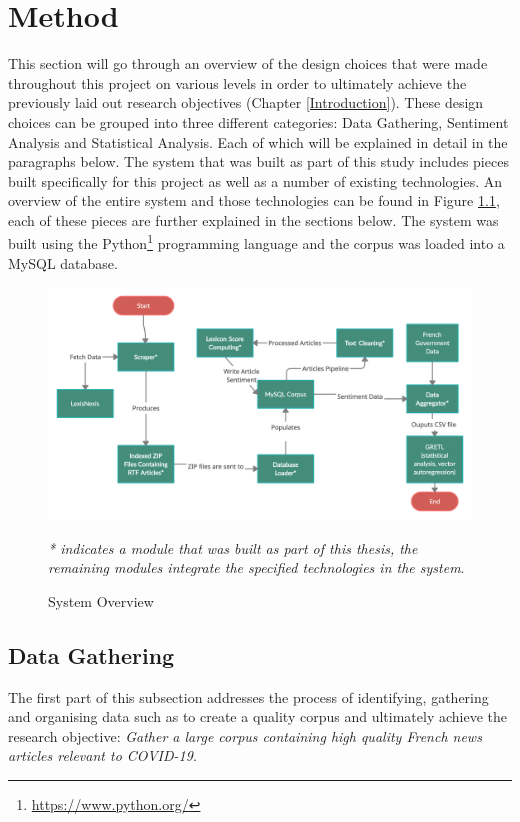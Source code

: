 \chapter{Method}\label{Method}

This section will go through an overview of the design choices that were made throughout this project on various levels in order to ultimately achieve the previously laid out research objectives (Chapter \ref{Introduction}). These design choices can be grouped into three different categories: Data Gathering, Sentiment Analysis and Statistical Analysis. Each of which will be explained in detail in the paragraphs below. The system that was built as part of this study includes pieces built specifically for this project as well as a number of existing technologies. An overview of the entire system and those technologies can be found in Figure \ref{system figure}, each of these pieces are further explained in the sections below. The system was built using the Python\footnote{\url{https://www.python.org/}} programming language and the corpus was loaded into a MySQL database.


\begin{figure}[h!]
      \centering
      \includegraphics[scale=0.23]{method/system_1.png}
      \caption{System Overview}
      \label{system figure}
      \emph{* indicates a module that was built as part of this thesis, the remaining modules integrate the specified technologies in the system}.
\end{figure}

\section{Data Gathering}

The first part of this subsection addresses the process of identifying, gathering and organising data such as to create a quality corpus and ultimately achieve the research objective: \emph{Gather a large corpus containing high quality French news articles relevant to COVID-19}.

